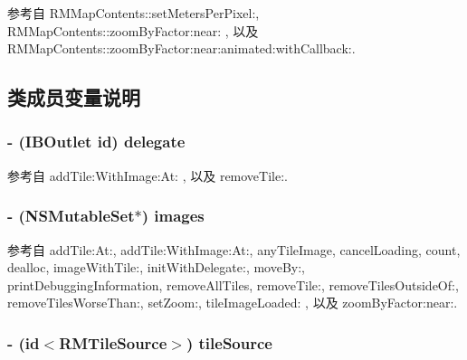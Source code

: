 参考自 R\-M\-Map\-Contents\-::set\-Meters\-Per\-Pixel\-:, R\-M\-Map\-Contents\-::zoom\-By\-Factor\-:near\-: , 以及 R\-M\-Map\-Contents\-::zoom\-By\-Factor\-:near\-:animated\-:with\-Callback\-:.



\subsection{类成员变量说明}
\hypertarget{interface_r_m_tile_image_set_a9c70ab2e2d4366bd9e8dc7f5eebf7333}{
\subsubsection[{delegate}]{\setlength{\rightskip}{0pt plus 5cm}-\/ (I\-B\-Outlet id) delegate\hspace{0.3cm}{\ttfamily [protected]}}}\label{interface_r_m_tile_image_set_a9c70ab2e2d4366bd9e8dc7f5eebf7333}


参考自 add\-Tile\-:\-With\-Image\-:\-At\-: , 以及 remove\-Tile\-:.

\hypertarget{interface_r_m_tile_image_set_a0ce4a1ac5b6c436d625de6066b5b2d97}{
\subsubsection[{images}]{\setlength{\rightskip}{0pt plus 5cm}-\/ (N\-S\-Mutable\-Set$\ast$) images\hspace{0.3cm}{\ttfamily [protected]}}}\label{interface_r_m_tile_image_set_a0ce4a1ac5b6c436d625de6066b5b2d97}


参考自 add\-Tile\-:\-At\-:, add\-Tile\-:\-With\-Image\-:\-At\-:, any\-Tile\-Image, cancel\-Loading, count, dealloc, image\-With\-Tile\-:, init\-With\-Delegate\-:, move\-By\-:, print\-Debugging\-Information, remove\-All\-Tiles, remove\-Tile\-:, remove\-Tiles\-Outside\-Of\-:, remove\-Tiles\-Worse\-Than\-:, set\-Zoom\-:, tile\-Image\-Loaded\-: , 以及 zoom\-By\-Factor\-:near\-:.

\hypertarget{interface_r_m_tile_image_set_a2ec72937c3da5ee7f70a2aa1a3590f8b}{
\subsubsection[{tile\-Source}]{\setlength{\rightskip}{0pt plus 5cm}-\/ (id$<${\bf R\-M\-Tile\-Source}$>$) tile\-Source\hspace{0.3cm}{\ttfamily [protected]}}}\label{interface_r_m_tile_image_set_a2ec72937c3da5ee7f70a2aa1a3590f8b}


